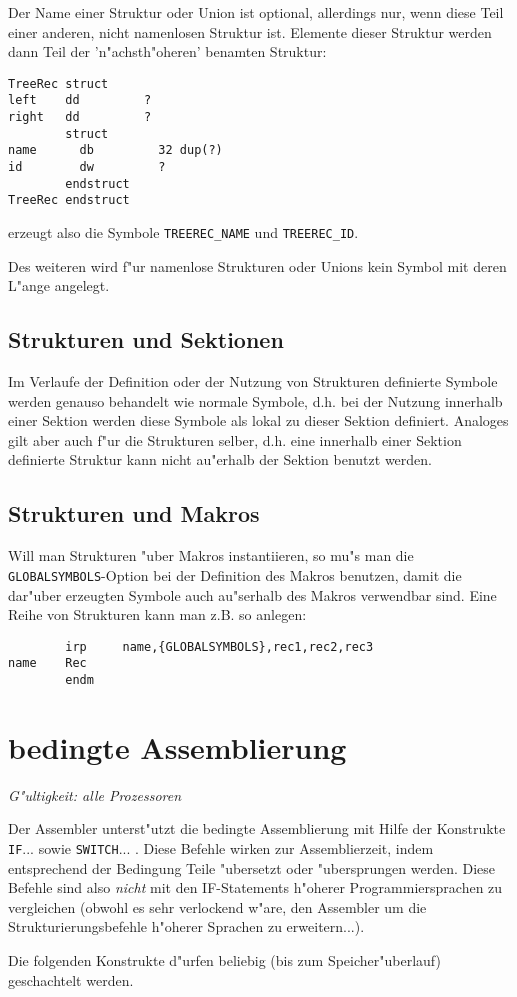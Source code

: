 \documentclass[12pt,a4paper,twoside]{report}
\newcommand{\ii}[1]{{\it #1}}
\newcommand{\tty}[1]{{\tt #1}}
\begin{document}
Der Name einer Struktur oder Union ist optional, allerdings nur, wenn
diese Teil einer anderen, nicht namenlosen Struktur ist.  Elemente
dieser Struktur werden dann Teil der 'n"achsth"oheren' benamten
Struktur:
\begin{verbatim}
TreeRec struct
left    dd         ?
right   dd         ?
        struct
name      db         32 dup(?)
id        dw         ?
        endstruct
TreeRec endstruct
\end{verbatim}
erzeugt also die Symbole {\tt TREEREC\_NAME} und {\tt TREEREC\_ID}.

Des weiteren wird f"ur namenlose Strukturen oder Unions kein Symbol
mit deren L"ange angelegt.

\subsection{Strukturen und Sektionen}

Im Verlaufe der Definition oder der Nutzung von Strukturen definierte
Symbole werden genauso behandelt wie normale Symbole, d.h. bei der Nutzung
innerhalb einer Sektion werden diese Symbole als lokal zu dieser Sektion
definiert.  Analoges gilt aber auch f"ur die Strukturen selber, d.h. eine
innerhalb einer Sektion definierte Struktur kann nicht au"erhalb der
Sektion benutzt werden.

\subsection{Strukturen und Makros}

Will man Strukturen "uber Makros instantiieren, so mu"s man die
\tty{GLOBALSYMBOLS}-Option bei der Definition des Makros
benutzen, damit die dar"uber erzeugten Symbole auch au"serhalb
des Makros verwendbar sind.  Eine Reihe von Strukturen kann man
z.B. so anlegen:

\begin{verbatim}
        irp     name,{GLOBALSYMBOLS},rec1,rec2,rec3
name    Rec
        endm
\end{verbatim}


\section{bedingte Assemblierung}

{\em G"ultigkeit: alle Prozessoren}

Der Assembler unterst"utzt die bedingte Assemblierung mit Hilfe der
Konstrukte \tty{IF}... sowie \tty{SWITCH}... .  Diese Befehle wirken zur
Assemblierzeit, indem entsprechend der Bedingung Teile "ubersetzt oder
"ubersprungen werden.  Diese Befehle sind also \ii{nicht} mit den
IF-Statements h"oherer Programmiersprachen zu vergleichen (obwohl es
sehr verlockend w"are, den Assembler um die Strukturierungsbefehle
h"oherer Sprachen zu erweitern...).
\par
Die folgenden Konstrukte d"urfen beliebig (bis zum Speicher"uberlauf)
geschachtelt werden.
\end{document}
